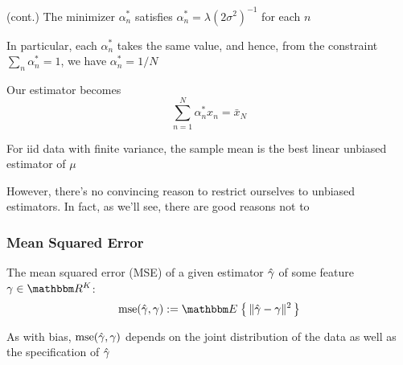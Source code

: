 \begin{frame}

    \vspace{2em}
    \Eg (cont.)
    The minimizer $\alpha_n^*$
    satisfies $\alpha_n^* = \lambda  (2 \sigma^2)^{-1}$ for each $n$
    
    In particular, each $\alpha_n^*$ takes the same value, and hence, from the
    constraint $\sum_n \alpha_n^* = 1$, we have $\alpha_n^* = 1/N$
    
    \vspace{.7em}
    Our estimator becomes 
    \begin{equation*}
        \sum_{n=1}^N \alpha_n^* x_n  
        = \bar x_N
    \end{equation*}
    
    
    For {\sc iid} data with finite variance, the sample mean
    is the best linear unbiased estimator of $\mu$

\end{frame}

\begin{frame}

    \vspace{2em}
    However, there's no
    convincing reason to restrict ourselves to unbiased estimators.  In fact, as
    we'll see, there are good reasons not to
    
\end{frame}

\begin{frame}\frametitle{Mean Squared Error}

    \vspace{2em}
    The mean squared error (MSE) of a
    given estimator $\hat \gamma$ of some feature $\gamma \in \RR^K$:
    \begin{equation}
    \label{eq:mse}
    \mse (\hgamma, \gamma) := \EE \left\{ \, \| \hgamma - \gamma \|^2 \, \right\}
    \end{equation}
    
    \vspace{.7em}
    As with bias, $\operatorname{mse}(\hat \gamma, \gamma)$ depends on the joint distribution of the data as
    well as the specification of $\hat \gamma$
    
\end{frame}

